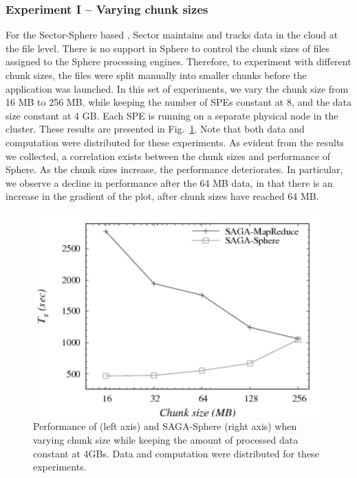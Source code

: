 \documentclass[graybox]{svmult}
\begin{document}
\subsubsection{Experiment I -- Varying chunk sizes} 

For the Sector-Sphere based \wc, Sector maintains and tracks data in
the cloud at the file level. There is no support in Sphere to control
the chunk sizes of files assigned to the Sphere processing
engines. Therefore, to experiment with different chunk sizes, the
files were split manually into smaller chunks before the \wc
application was launched. In this set of experiments, we vary the
chunk size from 16 MB to 256 MB, while keeping the number of SPEs
constant at 8, and the data size constant at 4 GB. Each SPE is running
on a separate physical node in the cluster. These results are
presented in Fig.~\ref{fig:sphere_mr_chunksize}.  Note that both data
and computation were distributed for these experiments.  As evident
from the results we collected, a correlation exists between the chunk
sizes and performance of Sphere.  As the chunk sizes increase, the
performance deteriorates. In particular, we observe a decline in
performance after the 64 MB data, in that there is an increase in the
gradient of the plot, after chunk sizes have reached 64 MB.


\begin{figure}[htb!]
 \dnnn\dnnn
 \includegraphics[width=1.0\textwidth]{figures/sphere_mr_varying_chunksize-gray.pdf}
 \caption{
   Performance of \sagamapreduce (left axis) and
   SAGA-Sphere (right axis) when varying chunk size while keeping the amount
   of processed data constant at 4GBs. Data and computation were
   distributed for these experiments.
   \label{fig:sphere_mr_chunksize}
   }
\end{figure}
\end{document}
